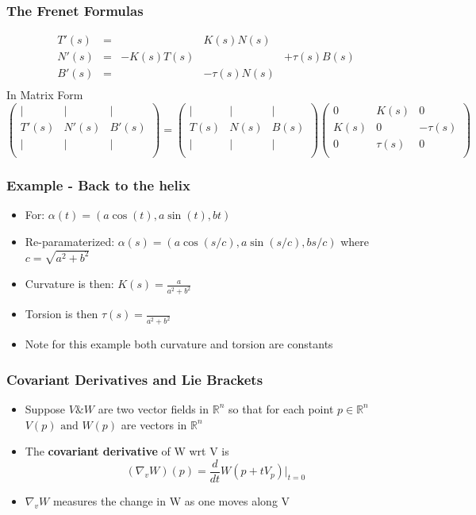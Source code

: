 \documentclass[10pt]{beamer}
\newcommand{\myemph}[1]{{\usebeamercolor[fg]{emphprimary}
    \textbf{#1}}}
\begin{document}
\begin{frame}
  \frametitle{The Frenet Formulas}
  \[
    \begin{array}{rclll}
      T'(s)   &=& & K(s) N(s )& \\
      N'(s)   &=&-K(s) T(s) && + \tau(s) B(s)\\
      B'(s)   & =& & -\tau(s) N(s) \\
    \end{array}
  \]
  In Matrix Form
  \[
    \left(
      \begin{array}{ccc}
        | & | & | \\
        T'(s) & N'(s) & B'(s)\\
        | & | & | \\
      \end{array}
    \right) =
    \left(
      \begin{array}{ccc}
        | & | & | \\
        T(s) & N(s) & B(s)\\
        | & | & | \\
      \end{array}
    \right)
    \left(
      \begin{array}{ccc}
        0 & K(s)& 0 \\
        K(s) & 0 & -\tau(s)\\
        0  & \tau(s) & 0\\
      \end{array}
    \right)
  \]
\end{frame}

\begin{frame}
  \frametitle{Example - Back to the helix}
  \begin{itemize}
  \item For: $\alpha(t) = (a \cos(t), a \sin(t), bt)$
  \item Re-paramaterized: $\alpha(s) = (a \cos(s/c), a \sin(s/c), b s/c)$ where $c = \sqrt{a^2 + b^2}$
  \item Curvature is then: $K(s) = \frac{a}{a^2+b^2}$
  \item Torsion is then $\tau(s) = \frac{}{a^2+b^2}$
  \item Note for this example both curvature and torsion are constants
  \end{itemize}
\end{frame}

\begin{frame}
  \frametitle{Covariant Derivatives and Lie Brackets}
  \begin{itemize}
  \item Suppose $V \& W$ are two vector fields in $\mathbb{R}^n$ so
    that for each point $p \in \mathbb{R}^n$ $V(p) \mbox{ and } W(p)$
    are vectors in $\mathbb{R}^n$
  \item The \myemph{covariant derivative} of W wrt V is
    \[
      (\nabla_v W)(p) = \frac{d}{dt} W(p + t V_p)|_{t = 0}
    \]
  \item $\nabla_v W$ measures the change in W as one moves along V
  \end{itemize}
\end{frame}
\end{document}
